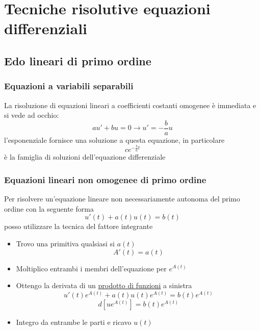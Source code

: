 \section{Tecniche risolutive equazioni differenziali}
\subsection{Edo lineari di primo ordine}
\subsubsection*{Equazioni a variabili separabili}
\label{edol1}
La risoluzione di equazioni lineari a coefficienti costanti omogenee è immediata e si vede ad occhio:
\[
	au' + bu = 0 \rightarrow u' = -\frac{b}{a}u
\]
l'esponenziale fornisce una soluzione a questa equazione, in particolare
\[
	ce ^{-\frac{b}{a}t}
\]
è la famiglia di soluzioni dell'equazione differenziale

\subsubsection*{Equazioni lineari non omogenee di primo ordine}
Per risolvere un'equazione lineare non necessariamente autonoma del primo ordine con la seguente forma
\[
	u'\left( t \right) + a\left( t \right) u\left( t \right) = b\left( t \right)
\]
posso utilizzare la tecnica del fattore integrante
\begin{itemize}
	\item Trovo una primitiva qualsiasi si $ a\left( t \right)  $
	      \[
		      A'\left( t \right)=a\left( t \right)
	      \]
	\item Moltiplico entrambi i membri dell'equazione per $ e^{A\left( t \right) } $
	\item Ottengo la derivata di un \underline{prodotto di funzioni} a sinistra
	      \[
		      u'\left( t \right)e^{A\left( t \right) } + a\left( t \right) u\left( t \right) e^{A\left( t \right) } = b\left( t \right) e^{A\left( t \right) }
	      \]
	      \[
		      d \left[ ue^{A\left( t \right) } \right] = b\left( t \right) e^{A\left( t \right) }
	      \]
	\item Integro da entrambe le parti e ricavo $ u\left( t \right)  $
\end{itemize}


